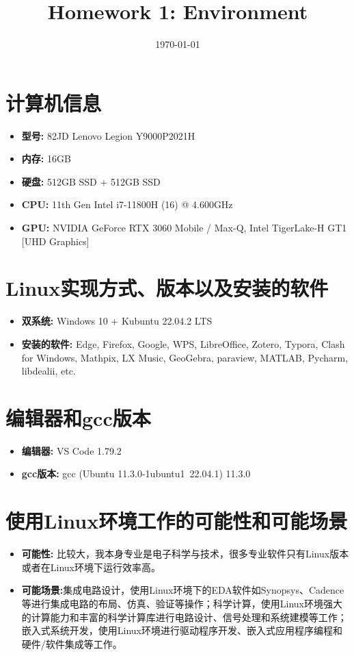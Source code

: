 \documentclass[12pt, a4paper, oneside]{ctexart}
\title{\textbf{Homework 1: Environment}}
\date{\today}
\begin{document}
\maketitle


\section{计算机信息}
\begin{itemize}
    \item \textbf{型号:} 82JD Lenovo Legion Y9000P2021H 
    \item \textbf{内存:} 16GB
    \item \textbf{硬盘:} 512GB SSD + 512GB SSD
    \item \textbf{CPU:} 11th Gen Intel i7-11800H (16) @ 4.600GHz 
    \item \textbf{GPU:} NVIDIA GeForce RTX 3060 Mobile / Max-Q, Intel TigerLake-H GT1 [UHD Graphics] 
    
\end{itemize}
\section{Linux实现方式、版本以及安装的软件}
\begin{itemize}
    \item \textbf{双系统:} Windows 10 + Kubuntu 22.04.2 LTS 
    \item \textbf{安装的软件:} Edge, Firefox, Google, WPS, LibreOffice, Zotero, Typora, Clash for Windows, Mathpix, LX Music,
GeoGebra, paraview, MATLAB, Pycharm, libdealii, etc. 
    
\end{itemize}
\section{编辑器和gcc版本}
\begin{itemize}
    \item \textbf{编辑器:} VS Code 1.79.2
    \item \textbf{gcc版本:} gcc (Ubuntu 11.3.0-1ubuntu1~22.04.1) 11.3.0

\end{itemize}

\section{使用Linux环境工作的可能性和可能场景}
\begin{itemize}
    \item \textbf{可能性:} 比较大，我本身专业是电子科学与技术，很多专业软件只有Linux版本或者在Linux环境下运行效率高。
    \item \textbf{可能场景:}集成电路设计，使用Linux环境下的EDA软件如Synopsys、Cadence等进行集成电路的布局、仿真、验证等操作；科学计算，使用Linux环境强大的计算能力和丰富的科学计算库进行电路设计、信号处理和系统建模等工作；嵌入式系统开发，使用Linux环境进行驱动程序开发、嵌入式应用程序编程和硬件/软件集成等工作。

\end{itemize}
\end{document}
